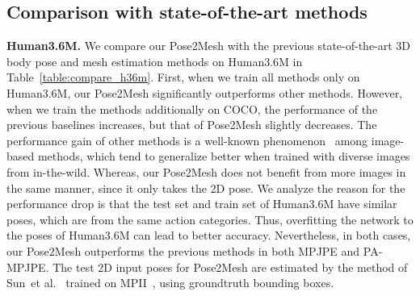 \documentclass[runningheads]{llncs}
\begin{document}
\begin{table*}[t]
\centering
\setlength\tabcolsep{1.0pt}
\def\arraystretch{1.1}
\centering
{}
\end{table*}
\vspace{-2mm}

\subsection{Comparison with state-of-the-art methods}

\textbf{Human3.6M.}
We compare our Pose2Mesh with the previous state-of-the-art 3D body pose and mesh estimation methods on Human3.6M in Table~\ref{table:compare_h36m}.
First, when we train all methods only on Human3.6M, our Pose2Mesh significantly outperforms other methods.
However, when we train the methods additionally on COCO, the performance of the previous baselines increases, but that of Pose2Mesh slightly decreases.
The performance gain of other methods is a well-known phenomenon~\cite{sun2018integral} among image-based methods, which tend to generalize better when trained with diverse images from in-the-wild.
Whereas, our Pose2Mesh does not benefit from more images in the same manner, since it only takes the 2D pose.
We analyze the reason for the performance drop is that the test set and train set of Human3.6M have similar poses, which are from the same action categories.
Thus, overfitting the network to the poses of Human3.6M can lead to better accuracy.
Nevertheless, in both cases, our Pose2Mesh outperforms the previous methods in both MPJPE and PA-MPJPE.
The test 2D input poses for Pose2Mesh are estimated by the method of Sun~et al.~\cite{sun2018integral} trained on MPII~\cite{andriluka2014mpii}, using groundtruth bounding boxes.
\end{document}
